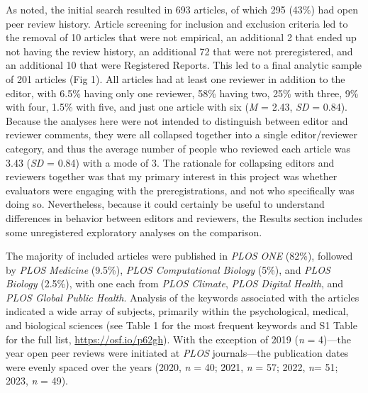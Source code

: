 \documentclass[authordate, empirical]{jote-new-article}
\begin{document}
	As noted, the initial search resulted in 693 articles, of which 295 (43\%) had open peer review history. Article screening for inclusion and exclusion criteria led to the removal of 10 articles that were not empirical, an additional 2 that ended up not having the review history, an additional 72 that were not preregistered, and an additional 10 that were Registered Reports. This led to a final analytic sample of 201 articles (Fig 1). All articles had at least one reviewer in addition to the editor, with 6.5\% having only one reviewer, 58\% having two, 25\% with three, 9\% with four, 1.5\% with five, and just one article with six (\emph{M} = 2.43, \emph{SD} = 0.84). Because the analyses here were not intended to distinguish between editor and reviewer comments, they were all collapsed together into a single editor/reviewer category, and thus the average number of people who reviewed each article was 3.43 (\emph{SD} = 0.84) with a mode of 3. The rationale for collapsing editors and reviewers together was that my primary interest in this project was whether evaluators were engaging with the preregistrations, and not who specifically was doing so. Nevertheless, because it could certainly be useful to understand differences in behavior between editors and reviewers, the Results section includes some unregistered exploratory analyses on the comparison.

	

	The majority of included articles were published in \emph{PLOS ONE} (82\%), followed by \emph{PLOS Medicine} (9.5\%), \emph{PLOS Computational Biology} (5\%), and \emph{PLOS Biology} (2.5\%), with one each from \emph{PLOS Climate}, \emph{PLOS Digital Health}, and \emph{PLOS Global Public Health}. Analysis of the keywords associated with the articles indicated a wide array of subjects, primarily within the psychological, medical, and biological sciences (see Table 1 for the most frequent keywords and S1 Table for the full list, \url{https://osf.io/p62gh}). With the exception of 2019 (\emph{n} = 4)—the year open peer reviews were initiated at \emph{PLOS} journals—the publication dates were evenly spaced over the years (2020, \emph{n} = 40; 2021, \emph{n} = 57; 2022, \emph{n}= 51; 2023, \emph{n} = 49).
\end{document}
